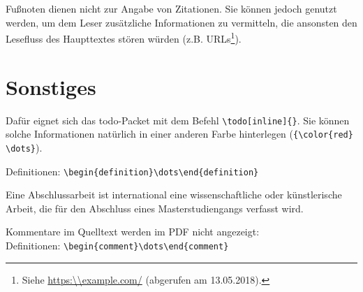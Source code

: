 \documentclass[twoside,bibliography=totoc,openany]{fumi}
\begin{document}
Fußnoten dienen nicht zur Angabe von Zitationen. Sie können jedoch genutzt werden, um dem Leser zusätzliche Informationen zu vermitteln, die ansonsten den Lesefluss des Haupttextes stören würden (z.B. URLs\footnote{Siehe \url{https:\\example.com/} (abgerufen am 13.05.2018).}).
%

\section{Sonstiges}

 Dafür eignet sich das todo-Packet mit dem Befehl \protect\verb|\todo[inline]{}|. {\color{red} Sie können solche Informationen natürlich in einer anderen Farbe hinterlegen (\verb|{\color{red} \dots}|).}

Definitionen: \verb|\begin{definition}\dots\end{definition}|

\begin{definition}
Eine Abschlussarbeit ist international eine wissenschaftliche oder künstlerische Arbeit, die für den Abschluss eines Masterstudiengangs verfasst wird.
\end{definition}

Kommentare im Quelltext werden im PDF nicht angezeigt:\\ Definitionen: \verb|\begin{comment}\dots\end{comment}|
\end{document}
